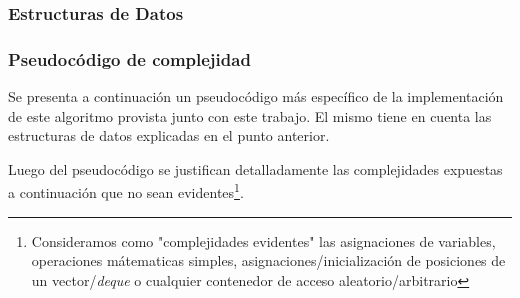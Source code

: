 \subsubsection{Estructuras de Datos}

\subsubsection{Pseudoc\'odigo de complejidad}
\par Se presenta a continuaci\'on un pseudoc\'odigo m\'as espec\'ifico de la implementaci\'on
    de este algoritmo provista junto con este trabajo. El mismo tiene en cuenta
    las estructuras de datos explicadas en el punto anterior.

\par Luego del pseudoc\'odigo se justifican detalladamente las complejidades
    expuestas a continuaci\'on que no sean evidentes\footnote{Consideramos
    como "complejidades evidentes" las asignaciones de variables, operaciones
    m\'atematicas simples, asignaciones/inicializaci\'on de posiciones de
    un vector/\emph{deque} o cualquier contenedor de acceso aleatorio/arbitrario}.

\bigskip

